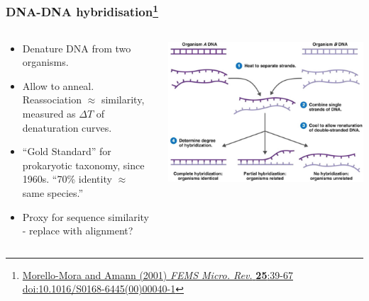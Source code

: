 \begin{frame}
  \frametitle{DNA-DNA hybridisation\footnote{\tiny{\href{http://dx.doi.org/10.1016/S0168-6445(00)00040-1}{Morello-Mora and Amann (2001) \textit{FEMS Micro. Rev.} \textbf{25}:39-67 doi:10.1016/S0168-6445(00)00040-1}}}}
  \begin{columns}[T]
    \begin{column}{5cm}
      \begin{itemize}
        \item Denature DNA from two organisms.
        \item Allow to anneal. Reassociation $\approx$ similarity, measured as $\Delta T$  of denaturation curves.
        \item ``Gold Standard'' for prokaryotic taxonomy, since 1960s. ``70\% identity $\approx$ same species.''
        \item Proxy for sequence similarity - replace with alignment?
      \end{itemize}
    \end{column}
    \begin{column}{5cm}
      \includegraphics[width=1\textwidth]{images/ddh}
    \end{column}
  \end{columns}
\end{frame}

